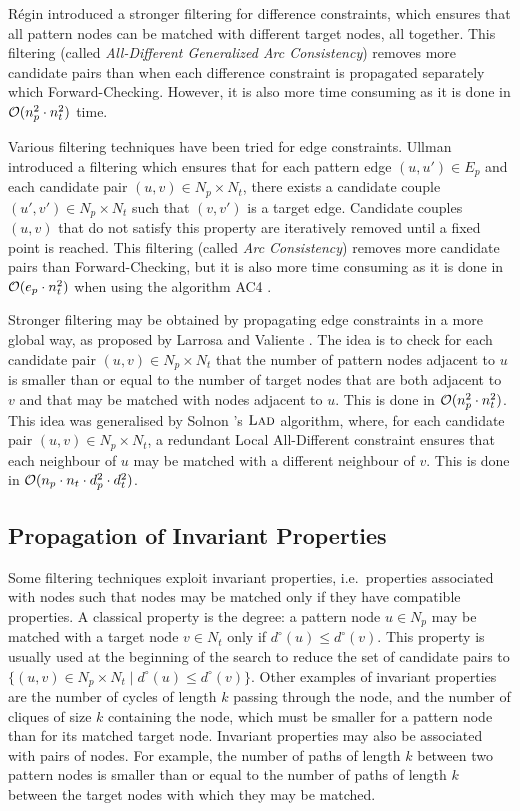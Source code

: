 \documentclass{llncs}
\newcommand{\LAD}{$\textsc{Lad}$\xspace}
\begin{document}
R\'egin \cite{regin} introduced a stronger filtering for difference constraints, which ensures that
all pattern nodes can be matched with different target nodes, all together. This filtering (called
\emph{All-Different Generalized Arc Consistency}) removes more candidate pairs than when each
difference constraint is propagated separately which Forward-Checking. However, it is also more time
consuming as it is done in ${\cal O}(n_p^2\cdot n_t^2)$ time.

Various filtering techniques have been tried for edge constraints. Ullman \cite{ullman} introduced a
filtering which ensures that for each pattern edge $(u,u')\in E_p$ and each candidate pair $(u,v)\in
N_p\times N_t$, there exists a candidate couple $(u',v')\in N_p\times N_t$ such that $(v,v')$ is a
target edge. Candidate couples $(u,v)$ that do not satisfy this property are iteratively removed
until a fixed point is reached. This filtering (called \emph{Arc Consistency}) removes more
candidate pairs than Forward-Checking, but it is also more time consuming as it is done in ${\cal
O}(e_p\cdot n_t^2)$ when using the algorithm AC4  \cite{MH86}.

Stronger filtering may be obtained by propagating edge constraints in a more global way, as proposed
by Larrosa and Valiente \cite{LV02}. The idea is to check for each candidate pair $(u,v)\in
N_p\times N_t$ that the number of pattern nodes adjacent to $u$ is smaller than or equal to the
number of target nodes that are both adjacent to $v$ and that may be matched with nodes adjacent to
$u$. This is done in ${\cal O}(n_p^2\cdot n_t^2)$. This idea was generalised by Solnon
\cite{Solnon:2010}'s \LAD algorithm, where, for each candidate pair $(u,v)\in N_p\times N_t$, a redundant Local
All-Different constraint ensures that each neighbour of $u$ may be matched with a different
neighbour of $v$. This is done in ${\cal O}(n_p\cdot n_t\cdot d_p^2\cdot d_t^2)$.

\subsection{Propagation of Invariant Properties}

Some filtering techniques exploit invariant properties, i.e.\ properties associated with nodes such
that nodes may be matched only if they have compatible properties. A classical property is the
degree: a pattern node $u\in N_p$ may be matched with a target node $v\in N_t$ only if
$d^\circ(u)\leq d^\circ(v)$. This property is usually used at the beginning of the search to reduce
the set of candidate pairs to $\{(u,v)\in N_p\times N_t\;|\;d^\circ(u)\leq d^\circ(v)\}$.  Other
examples of invariant properties are the number of cycles of length $k$ passing through the node,
and the number of cliques of size $k$ containing the node, which must be smaller for a pattern node
than for its matched target node.  Invariant properties may also be associated with pairs of nodes.
For example, the number of paths of length $k$ between two pattern nodes is smaller than or equal to
the number of paths of length $k$ between the target nodes with which they may be matched.
\end{document}
